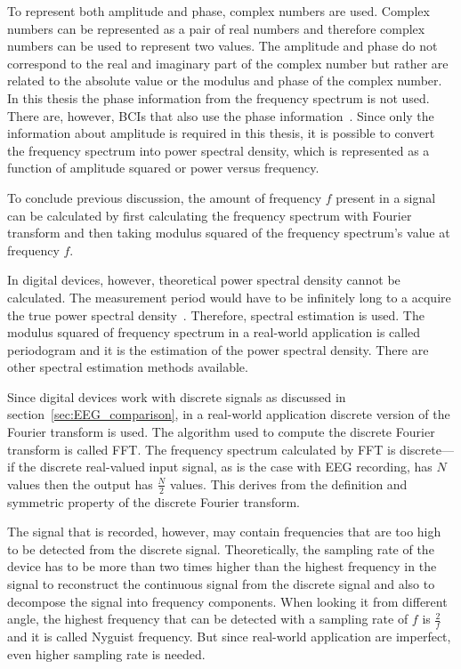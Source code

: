To represent both amplitude and phase, complex numbers are used. Complex numbers can be represented as a pair of real numbers and therefore complex numbers can be used to represent two values. The amplitude and phase do not correspond to the real and imaginary part of the complex number but rather are related to the absolute value or the modulus and phase of the complex number. In this thesis the phase information from the \gls{frequency spectrum} is not used. There are, however, \glspl{BCI} that also use the phase information~\cite{MPCC}. Since only the information about amplitude is required in this thesis, it is possible to convert the \gls{frequency spectrum} into \gls{power spectral density}, which is represented as a function of amplitude squared or power versus frequency.

To conclude previous discussion, the amount of frequency $f$ present in a signal can be calculated by first calculating the \gls{frequency spectrum} with \gls{Fourier transform} and then taking modulus squared of the \gls{frequency spectrum}'s value at frequency $f$.

In digital devices, however, theoretical \gls{power spectral density} cannot be calculated. The measurement period would have to be infinitely long to a acquire the true \gls{power spectral density}~\cite{psd}. Therefore, spectral estimation is used. The modulus squared of frequency spectrum in a real-world application is called \gls{periodogram} and it is the estimation of the \gls{power spectral density}. There are other spectral estimation methods available.

Since digital devices work with discrete signals as discussed in section~\ref{sec:EEG_comparison}, in a real-world application discrete version of the \gls{Fourier transform} is used. The algorithm used to compute the discrete \gls{Fourier transform} is called \gls{FFT}. The \gls{frequency spectrum} calculated by \gls{FFT} is discrete---if the discrete real-valued input signal, as is the case with \gls{EEG} recording, has $N$ values then the output has $\frac{N}{2}$ values. This derives from the definition and symmetric property of the discrete \gls{Fourier transform}. %

The signal that is recorded, however, may contain frequencies that are too high to be detected from the discrete signal. Theoretically, the \gls{sampling rate} of the device has to be more than two times higher than the highest frequency in the signal to reconstruct the continuous signal from the discrete signal and also to decompose the signal into \glspl{frequency component}. When looking it from different angle, the highest frequency that can be detected with a \gls{sampling rate} of $f$ is $\frac{2}{f}$ and it is called \gls{Nyguist frequency}. But since real-world application are imperfect, even higher \gls{sampling rate} is needed.

